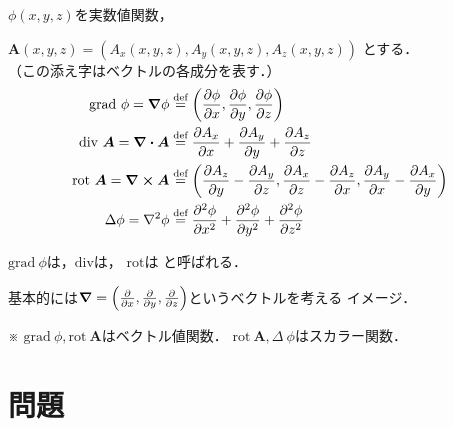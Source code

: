 \documentclass[dvipdfmx,a4j,11pt]{jsarticle}
\theoremstyle{mystyle}
\begin{document}
\begin{dfn}{}{}
   $\phi(x,y,z)$を実数値関数，

   $\bm{A} (x,y,z)=(A_x(x,y,z),A_y(x,y,z),A_z(x,y,z))$
   とする．\\
   （この添え字はベクトルの各成分を表す．）
   \begin{align}
      \text{grad}\ \phi = \grad \phi &\overset{\text{def}}{=}
      \qty(\pdv{\phi}{x},\pdv{\phi}{y},\pdv{\phi}{z})\\
      \text{div}\ \bm{A} = \div{\bm{A}} &\overset{\text{def}}{=}
      \pdv{A_x}{x}+\pdv{A_y}{y}+\pdv{A_z}{z}\\
      \text{rot}\ \bm{A} = \curl{ \bm{A}} &\overset{\text{def}}{=}
      \qty(\pdv{A_z}{y}-\pdv{A_y}{z},\pdv{A_x}{z}-\pdv{A_z}{x},
      \pdv{A_y}{x}-\pdv{A_x}{y})\\
      \Delta \phi = \laplacian \phi &\overset{\text{def}}{=}  
       \pdv[2]{\phi}{x}+\pdv[2]{\phi}{y}+\pdv[2]{\phi}{z}      
   \end{align}

   $\text{grad}\ \phi$は，$\text{div}$は，
   $\text{rot}$は と呼ばれる．
\end{dfn}

基本的には$\grad =\qty(\pdv{x},\pdv{y},\pdv{z})$というベクトルを考える
イメージ．

※ $\text{grad}\ \phi , \text{rot}\ \bm{A}$はベクトル値関数．
$\text{rot}\ \bm{A}, \Delta \ \phi $はスカラー関数．


\section{問題}
\end{document}
